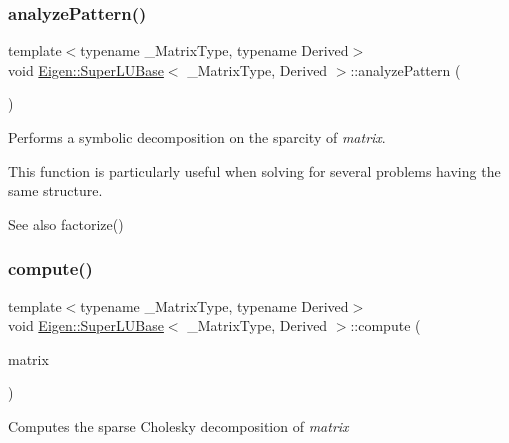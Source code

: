 \subsubsection{\texorpdfstring{analyzePattern()}{analyzePattern()}}
{\footnotesize\ttfamily template$<$typename \+\_\+\+Matrix\+Type, typename Derived$>$ \\
void \mbox{\hyperlink{class_eigen_1_1_super_l_u_base}{Eigen\+::\+Super\+L\+U\+Base}}$<$ \+\_\+\+Matrix\+Type, Derived $>$\+::analyze\+Pattern (\begin{DoxyParamCaption}\item[{const Matrix\+Type \&}]{ }\end{DoxyParamCaption})\hspace{0.3cm}{\ttfamily [inline]}}

Performs a symbolic decomposition on the sparcity of {\itshape matrix}.

This function is particularly useful when solving for several problems having the same structure.

\begin{DoxySeeAlso}{See also}
factorize() 
\end{DoxySeeAlso}
\mbox{\label{class_eigen_1_1_super_l_u_base_a28cb3ef7914ecb6fdae1935b53f6be40}} 
\subsubsection{\texorpdfstring{compute()}{compute()}}
{\footnotesize\ttfamily template$<$typename \+\_\+\+Matrix\+Type, typename Derived$>$ \\
void \mbox{\hyperlink{class_eigen_1_1_super_l_u_base}{Eigen\+::\+Super\+L\+U\+Base}}$<$ \+\_\+\+Matrix\+Type, Derived $>$\+::compute (\begin{DoxyParamCaption}\item[{const Matrix\+Type \&}]{matrix }\end{DoxyParamCaption})\hspace{0.3cm}{\ttfamily [inline]}}

Computes the sparse Cholesky decomposition of {\itshape matrix} \mbox{\label{class_eigen_1_1_super_l_u_base_aa67da5c8c24110931c949c5896c5ec03}} 
